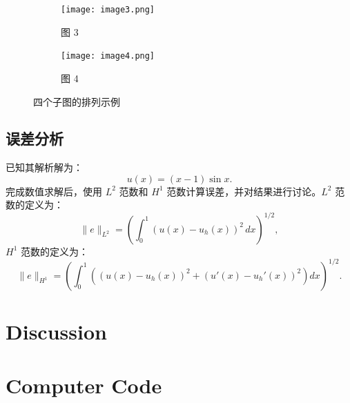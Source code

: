 \documentclass[11pt]{ctexart}
\begin{document}
\begin{figure}[htbp]
    \vspace{1em}
    
    \begin{subfigure}{0.45\textwidth}
        \centering
        \texttt{[image: image3.png]}
        \caption{图 3}
        \label{fig:sub3}
    \end{subfigure}
    \hfill
    \begin{subfigure}{0.45\textwidth}
        \centering
        \texttt{[image: image4.png]}
        \caption{图 4}
        \label{fig:sub4}
    \end{subfigure}
    
    \caption{四个子图的排列示例}
    \label{fig:four_figs}
\end{figure}

\subsection{误差分析}
已知其解析解为：
\begin{equation}
    u(x) = (x - 1) \sin x.
\end{equation}
完成数值求解后，使用 $L^2$ 范数和 $H^1$ 范数计算误差，并对结果进行讨论。$L^2$ 范数的定义为：
\begin{equation}
    \| e \|_{L^2} = \left( \int_0^1 (u(x) - u_h(x))^2 \, dx \right)^{1/2},
\end{equation}
$H^1$ 范数的定义为：
\begin{equation}
    \| e \|_{H^1} = \left( \int_0^1 \left( (u(x) - u_h(x))^2 + (u'(x) - u_h'(x))^2 \right) dx \right)^{1/2}.
\end{equation}

\section{Discussion}


\appendix
\section{Computer Code}
\end{document}
